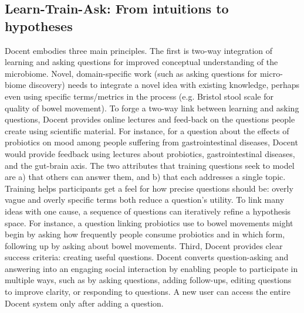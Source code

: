 \subsection{Learn-Train-Ask: From intuitions to hypotheses}
Docent embodies three main principles. The first is two-way integration of learning and asking questions for improved conceptual understanding of the microbiome. Novel, domain-specific work (such as asking questions for micro-biome discovery) needs to integrate a novel idea with existing knowledge, perhaps even using specific terms/metrics in the process (e.g. Bristol stool scale for quality of bowel movement). To forge a two-way link between learning and asking questions, Docent provides online lectures and feed-back on the questions people create using scientific material. For instance, for a question about the effects of probiotics on mood among people suffering from gastrointestinal diseases, Docent would provide feedback using lectures about probiotics, gastrointestinal diseases, and the gut-brain axis.
The two attributes that training questions seek to model are a) that others can answer them, and b) that each addresses a single topic. Training helps participants get a feel for how precise questions should be: overly vague and overly specific terms both reduce a question’s utility. To link many ideas with one cause, a sequence of questions can iteratively refine a hypothesis space. For instance, a question linking probiotics use to bowel movements might begin by asking how frequently people consume probiotics and in which form, following up by asking about bowel movements.
Third, Docent provides clear success criteria: creating useful questions. Docent converts question-asking and answering into an engaging social interaction by enabling people to participate in multiple ways, such as by asking questions, adding follow-ups, editing questions to improve clarity, or responding to questions. A new user can access the entire Docent system only after adding a question.

 
